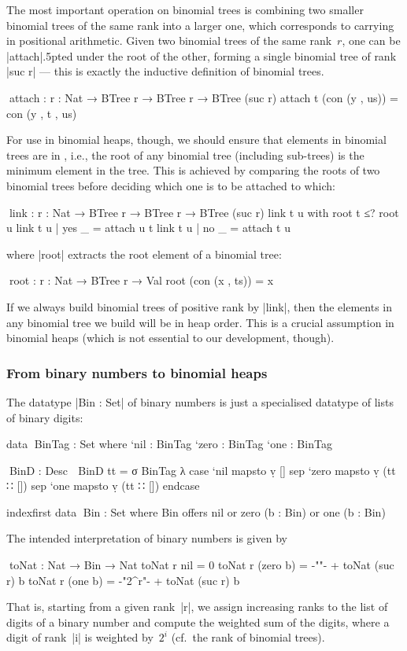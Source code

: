 The most important operation on binomial trees is combining two smaller binomial trees of the same rank into a larger one, which corresponds to carrying in positional arithmetic.
Given two binomial trees of the same rank~$r$, one can be |attach|{\kern.5pt}ed under the root of the other, forming a single binomial tree of rank |suc r| --- this is exactly the inductive definition of binomial trees.
\begin{code}
^^^attach : {r : Nat} → BTree r → BTree r → BTree (suc r)
attach t (con (y , us)) = con (y , t , us)
\end{code}
For use in binomial heaps, though, we should ensure that elements in binomial trees are in , i.e., the root of any binomial tree (including sub-trees) is the minimum element in the tree.
This is achieved by comparing the roots of two binomial trees before deciding which one is to be attached to which:
\begin{code}
^^^link : {r : Nat} → BTree r → BTree r → BTree (suc r)
link t u with root t ≤? root u
link t u | yes  _ = attach u t
link t u | no   _ = attach t u
\end{code}
where |root| extracts the root element of a binomial tree:
\begin{code}
^^^root : {r : Nat} → BTree r → Val
root (con (x , ts)) = x
\end{code}
If we always build binomial trees of positive rank by |link|, then the elements in any binomial tree we build will be in heap order.
This is a crucial assumption in binomial heaps (which is not essential to our development, though).

\subsubsection{From binary numbers to binomial heaps}
The datatype |Bin : Set| of binary numbers is just a specialised datatype of lists of binary digits:
\begin{code}
data ^^^BinTag : Set where
  `nil   : BinTag
  `zero  : BinTag
  `one   : BinTag

^^^BinD : Desc ⊤
BinD tt = σ BinTag λ  case  `nil   mapsto  ṿ []
                      sep   `zero  mapsto  ṿ (tt ∷ [])
                      sep   `one   mapsto  ṿ (tt ∷ []) endcase

indexfirst data ^^^Bin : Set where
  Bin  offers  nil
       or      zero  (b : Bin)
       or      one   (b : Bin)
\end{code}
The intended interpretation of binary numbers is given by
\begin{code}
^^^toNat : Nat → Bin → Nat
toNat r nil        = 0
toNat r (zero  b)  = {-"\phantom{2^r}"-} + toNat (suc r) b
toNat r (one   b)  = {-"2^r"-} + toNat (suc r) b
\end{code}
That is, starting from a given rank~|r|, we assign increasing ranks to the list of digits of a binary number and compute the weighted sum of the digits, where a digit of rank~|i| is weighted by~$2^i$ (cf.~the rank of binomial trees).

